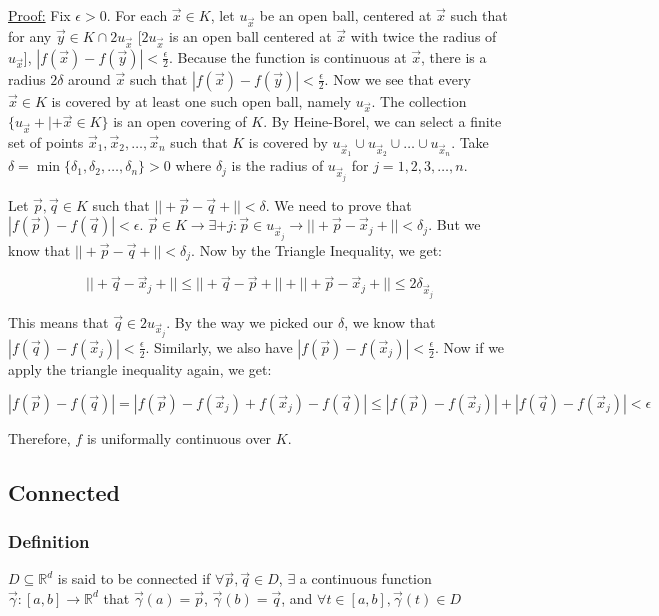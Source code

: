 \documentclass[11 pt, twoside]{article}
\begin{document}
\underline{Proof:}
Fix $\epsilon > 0$. For each $\vec{x} \in K$, let $u_{\vec{x}}$ be an open ball, centered at
$\vec{x}$ such that for any $\vec{y} \in K \cap 2u_{\vec{x}}$ [$2u_{\vec{x}}$ is
an open ball centered at $\vec{x}$ with twice the radius of $u_{\vec{x}}$], $|f(\vec{x}) -
f(\vec{y})| < \frac{\epsilon}{2}$. Because the function is continuous at
$\vec{x}$, there is a radius $2\delta$ around $\vec{x}$ such that $|f(\vec{x}) -
f(\vec{y})| < \frac{\epsilon}{2}$. Now we see that every $\vec{x} \in K$ is
covered by at least one such open ball, namely $u_{\vec{x}}$. The collection
$\{u_{\vec{x}} +|+ \vec{x} \in K\}$ is an open covering of $K$. By
Heine-Borel, we can select a finite set of points $\vec{x}_1, \vec{x}_2, \dots,
\vec{x}_n$ such that $K$ is covered by $u_{\vec{x}_1} \cup u_{\vec{x}_2} \cup \dots
\cup u_{\vec{x}_n}$. Take $\delta = \min\{\delta_1, \delta_2, \dots, \delta_n\}
> 0$  where $\delta_j$ is the radius of $u_{\vec{x}_j}$ for $j = 1,2,3,\dots,n$.

Let $\vec{p}, \vec{q} \in K$ such that $||+\vec{p} - \vec{q}+|| < \delta$. We
need to prove that $|f(\vec{p}) - f(\vec{q})| < \epsilon$. $\vec{p} \in K \to
\exists + j : \vec{p} \in u_{\vec{x}_j} \to ||+\vec{p} - \vec{x}_j+|| <
\delta_j$. But we know that $||+\vec{p} - \vec{q}+|| < \delta_j$. Now by the
Triangle Inequality, we get:

$$||+\vec{q} - \vec{x}_j+|| \leq ||+\vec{q} - \vec{p}+|| + ||+\vec{p} - \vec{x}_j+||
\leq 2 \delta_{\vec{x}_j}$$

This means that $\vec{q} \in 2u_{\vec{x}_j}$. By the way we picked our $\delta$,
we know that $|f(\vec{q}) - f(\vec{x}_j)| < \frac{\epsilon}{2}$. Similarly,
we also have $|f(\vec{p}) - f(\vec{x}_j)| < \frac{\epsilon}{2}$. Now if we
apply the triangle inequality again, we get:

$$|f(\vec{p}) - f(\vec{q})| = |f(\vec{p}) - f(\vec{x}_j) + f(\vec{x}_j)- f(\vec{q})|\leq |f(\vec{p}) - f(\vec{x}_j)| + |f(\vec{q}) -
f(\vec{x}_j)| < \epsilon$$

Therefore, $f$ is uniformally continuous over $K$.

\subsection{Connected}

\subsubsection{Definition}
$D \subseteq \mathbb{R}^d$ is said to be connected if $\forall \vec{p},
\vec{q} \in D$, $\exists$ a continuous function $\vec{\gamma}:[a, b] \to
\mathbb{R}^d$ that $\vec{\gamma}(a) = \vec{p}$, $\vec{\gamma}(b) = \vec{q}$,
and $\forall t \in [a, b], \vec{\gamma}(t) \in D$
\end{document}
